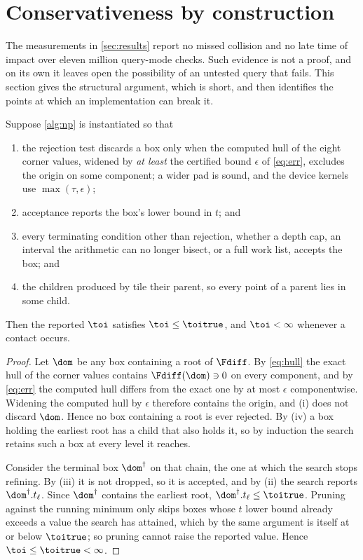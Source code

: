 \section{Conservativeness by construction}
\label{sec:guarantee}

The measurements in \cref{sec:results} report no missed collision and no late
time of impact over eleven million query-mode checks. Such evidence is not a
proof, and on its own it leaves open the possibility of an untested query that
fails. This section gives the structural argument, which is short, and then
identifies the points at which an implementation can break it.

\begin{theorem}[Conservativeness]
\label{thm:conservative}
Suppose \cref{alg:np} is instantiated so that
\begin{enumerate}
\item[(i)] the rejection test discards a box only when the computed hull of the
  eight corner values, widened by \emph{at least} the certified bound $\epsilon$
  of \cref{eq:err}, excludes the origin on some component; a wider pad is sound,
  and the device kernels use $\max(\tau,\epsilon)$;
\item[(ii)] acceptance reports the box's lower bound in $t$; and
\item[(iii)] every terminating condition other than rejection, whether a depth
  cap, an interval the arithmetic can no longer bisect, or a full work list,
  accepts the box; and
\item[(iv)] the children produced by  tile their parent, so every point
  of a parent lies in some child.
\end{enumerate}
Then the reported $\toi$ satisfies $\toi \le \toitrue$, and $\toi < \infty$
whenever a contact occurs.
\end{theorem}

\begin{proof}
Let $\dom$ be any box containing a root of $\Fdiff$. By \cref{eq:hull} the exact
hull of the corner values contains $\Fdiff(\dom) \ni 0$ on every component, and by
\cref{eq:err} the computed hull differs from the exact one by at most $\epsilon$
componentwise. Widening the computed hull by $\epsilon$ therefore contains the
origin, and (i) does not discard $\dom$. Hence no box containing a root is
ever rejected. By (iv) a box holding the earliest root has a child that also
holds it, so by induction the search retains such a box at every level it
reaches.

Consider the terminal box $\dom^{\dagger}$ on that chain, the one at which the
search stops refining. By (iii) it is not dropped, so it is accepted, and by
(ii) the search reports $\dom^{\dagger}.t_{\ell}$. Since $\dom^{\dagger}$
contains the earliest root, $\dom^{\dagger}.t_{\ell} \le \toitrue$. Pruning
against the running minimum only skips boxes whose $t$ lower bound already
exceeds a value the search has attained, which by the same argument is itself
at or below $\toitrue$; so pruning cannot raise the reported value. Hence $\toi
\le \toitrue < \infty$. \end{proof}

